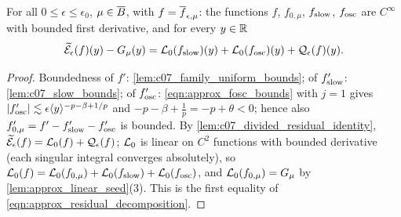 \begin{lemma}
  \label{lem:c07_residual_split}
  For all $0\le\epsilon\le\epsilon_0$, $\mu\in\overline{B}$, with $f=\overline{f}_{\epsilon,\mu}$: the functions $f$,
  $f_{0,\mu}$, $f_{\textup{slow}}$, $f_{\textup{osc}}$ are $C^\infty$ with bounded first derivative, and for every $y\in\mathbb{R}$
  \[
    \widetilde{\mathcal{E}}_\epsilon(f)(y)-G_\mu(y)=\mathcal{L}_0(f_{\textup{slow}})(y)+\mathcal{L}_0(f_{\textup{osc}})(y)+\mathcal{Q}_\epsilon(f)(y).
  \]
\end{lemma}
\begin{proof}
  Boundedness of $f'$: \cref{lem:c07_family_uniform_bounds}; of $f_{\textup{slow}}'$: \cref{lem:c07_slow_bounds};
  of $f_{\textup{osc}}'$: \eqref{eqn:approx_fosc_bounds} with $j=1$ gives $|f_{\textup{osc}}'|\lesssim\epsilon\langle y \rangle^{-p-\beta+1/p}$ and
  $-p-\beta+\frac1p=-p+\theta<0$; hence also $f_{0,\mu}'=f'-f_{\textup{slow}}'-f_{\textup{osc}}'$ is bounded. By
  \cref{lem:c07_divided_residual_identity}, $\widetilde{\mathcal{E}}_\epsilon(f)=\mathcal{L}_0(f)+\mathcal{Q}_\epsilon(f)$; $\mathcal{L}_0$ is linear on
  $C^2$ functions with bounded derivative (each singular integral converges absolutely), so
  $\mathcal{L}_0(f)=\mathcal{L}_0(f_{0,\mu})+\mathcal{L}_0(f_{\textup{slow}})+\mathcal{L}_0(f_{\textup{osc}})$, and $\mathcal{L}_0(f_{0,\mu})=G_\mu$ by
  \cref{lem:approx_linear_seed}(3). This is the first equality of \eqref{eqn:approx_residual_decomposition}.
\end{proof}

